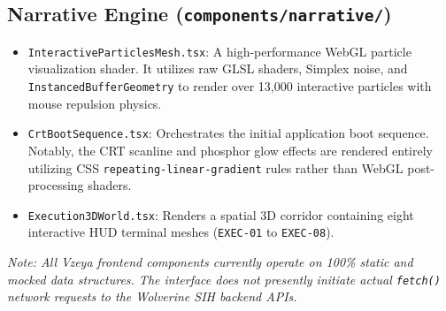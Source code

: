 \subsection{Narrative Engine (\texttt{components/narrative/})}
\begin{itemize}
    \item \texttt{InteractiveParticlesMesh.tsx}: A high-performance WebGL particle visualization shader. It utilizes raw GLSL shaders, Simplex noise, and \texttt{InstancedBufferGeometry} to render over 13,000 interactive particles with mouse repulsion physics.
    \item \texttt{CrtBootSequence.tsx}: Orchestrates the initial application boot sequence. Notably, the CRT scanline and phosphor glow effects are rendered entirely utilizing CSS \texttt{repeating-linear-gradient} rules rather than WebGL post-processing shaders.
    \item \texttt{Execution3DWorld.tsx}: Renders a spatial 3D corridor containing eight interactive HUD terminal meshes (\texttt{EXEC-01} to \texttt{EXEC-08}).
\end{itemize}

\vspace{1em}
\noindent \textit{Note: All Vzeya frontend components currently operate on 100\% static and mocked data structures. The interface does not presently initiate actual \texttt{fetch()} network requests to the Wolverine SIH backend APIs.}
